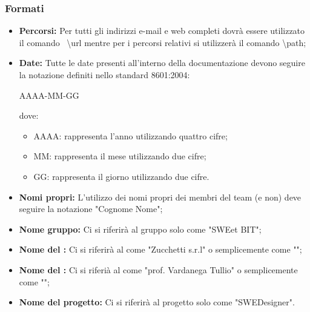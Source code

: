       \subsubsection{Formati}
        \begin{itemize}
          \item \textbf{Percorsi: }Per tutti gli indirizzi e-mail e web completi dovrà essere utilizzato il comando \glossaryItem{\LaTeX}\ \textbackslash url mentre per i percorsi
            relativi si utilizzerà il comando \textbackslash path;
          \item \textbf{Date: }Tutte le date presenti all'interno della documentazione devono seguire la notazione definiti nello standard  8601:2004:
            \begin{center}
              AAAA-MM-GG\\
            \end{center}
            dove:
            \bgroup
              \begin{itemize}
                \item AAAA: rappresenta l'anno utilizzando quattro cifre;
                \item MM: rappresenta il mese utilizzando due cifre;
                \item GG: rappresenta il giorno utilizzando due cifre.
              \end{itemize}
            \egroup
          \item \textbf{Nomi propri: }L'utilizzo dei nomi propri dei membri del team (e non) deve seguire la notazione "Cognome Nome";
          \item \textbf{Nome gruppo: }Ci si riferirà al gruppo solo come "SWEet BIT";
          \item \textbf{Nome del : }Ci si riferirà al  come "Zucchetti s.r.l" o semplicemente come "";
          \item \textbf{Nome del : }Ci si riferià al  come "prof. Vardanega Tullio" o semplicemente come "";
          \item \textbf{Nome del progetto: }Ci si riferirà al progetto solo come "SWEDesigner".
        \end{itemize}
